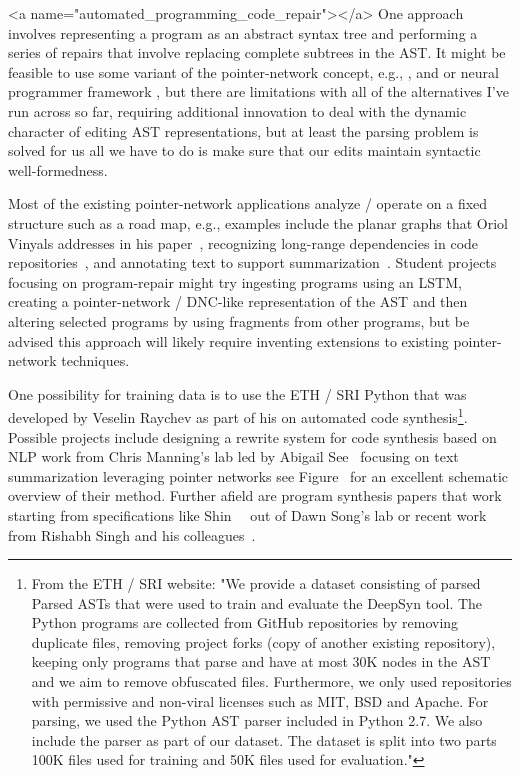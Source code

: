 
\rawhtml
<a name="automated_programming_code_repair"></a>
\endrawhtml
One approach involves representing a program as an abstract syntax tree and performing a series of repairs that involve replacing complete subtrees in the AST. It might be feasible to use some variant of the pointer-network concept, e.g., {\cite{BhoopchandetalICLR-17}}, {\cite{SeeetalACL-17}} and  {\cite{WangandJiangICLR-17}} or neural programmer framework {\cite{NeelakantanetalICLR-17}}, but there are limitations with all of the alternatives I've run across so far, requiring additional innovation to deal with the dynamic character of editing AST representations, but at least the parsing problem is solved for us \emdash{} all we have to do is make sure that our edits maintain syntactic well-formedness.

Most of the existing pointer-network applications analyze / operate on a fixed structure such as a road map, e.g., examples include the planar graphs that Oriol Vinyals addresses in his paper~\cite{VinyalsetalNIPS-15}, recognizing long-range dependencies in code repositories~\cite{BhoopchandetalICLR-17}, and annotating text to support summarization~\cite{SeeetalACL-17}. Student projects focusing on program-repair might try ingesting programs using an LSTM, creating a pointer-network / DNC-like representation of the AST and then altering selected programs by using fragments from other programs, but be advised this approach will likely require inventing extensions to existing pointer-network techniques.

One possibility for training data is to use the ETH / SRI Python {} that was developed by Veselin Raychev as part of his {} on automated code synthesis\footnote{%
%
  From the ETH / SRI website: "We provide a dataset consisting of parsed Parsed ASTs that were used to train and evaluate the DeepSyn tool. The Python programs are collected from GitHub repositories by removing duplicate files, removing project forks (copy of another existing repository), keeping only programs that parse and have at most 30K nodes in the AST and we aim to remove obfuscated files. Furthermore, we only used repositories with permissive and non-viral licenses such as MIT, BSD and Apache. For parsing, we used the Python AST parser included in Python 2.7. We also include the parser as part of our dataset. The dataset is split into two parts \emdash{} 100K files used for training and 50K files used for evaluation."}.
%
Possible projects include designing a rewrite system for code synthesis based on NLP work from Chris Manning's lab led by Abigail See~\cite{SeeetalACL-17} focusing on text summarization leveraging pointer networks \emdash{} see Figure~{} for an excellent schematic overview of their method. Further afield are program synthesis papers that work starting from specifications like Shin~\etal{}~\cite{ShinetalICLR-18b} out of Dawn Song's lab or recent work from Rishabh Singh and his colleagues~\cite{WangetalCoRR-17}.

